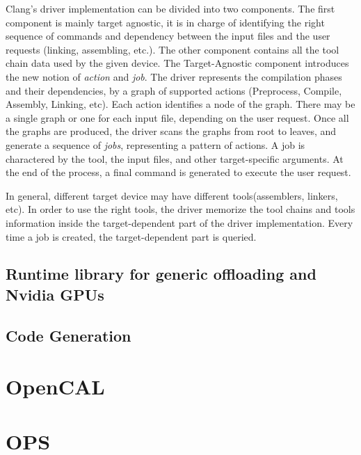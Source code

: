 Clang's driver implementation can be divided into two components. The first component is mainly target agnostic, it is in charge of identifying the right sequence of commands and dependency between the input files and the user requests (linking, assembling, etc.). The other component contains all the tool chain data used by the given device.
The Target-Agnostic component introduces the new notion of \emph{action} and \emph{job}. The driver represents the compilation phases and their dependencies, by a graph of supported actions (Preprocess, Compile, Assembly, Linking, etc). Each action identifies a node of the graph. There may be a single graph or one for each input file, depending on the user request. Once all the graphs are produced, the driver scans the graphs from root to leaves, and generate a sequence of \emph{jobs}, representing a pattern of actions. A job is charactered by the tool, the input files, and other target-specific arguments. At the end of the process, a final command is generated to execute the user request.

In general, different target device may have different tools(assemblers, linkers, etc). In order to use the right tools, the driver memorize the tool chains and tools information inside the target-dependent part of the driver implementation. Every time a job is created, the target-dependent part is queried. 



\subsection{Runtime library for generic offloading and Nvidia GPUs}

\subsection{Code Generation}


\section{OpenCAL}

\section{OPS}